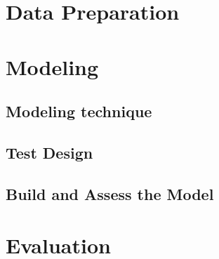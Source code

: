 \section*{Data Preparation}


\section*{Modeling}

\subsection*{Modeling technique}
\subsection*{Test Design}
\subsection*{Build and Assess the Model}


\section*{Evaluation}